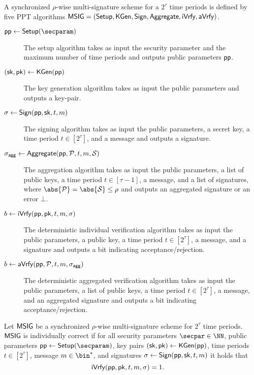 \begin{definition}\label{def:multisig} A synchronized $\rho$-wise multi-signature scheme for a $2^\tau$ time periods is defined by five PPT algorithms $\mathsf{MSIG}=(\mathsf{Setup}, \mathsf{KGen}, \mathsf{Sign},\allowbreak \mathsf{Aggregate},\allowbreak \mathsf{iVrfy}, \mathsf{aVrfy})$.
\begin{description}
  \item[$\params\gets\setup(\secparam)$] The setup algorithm takes as input the security parameter and the maximum number of time periods and outputs public parameters $\mathsf{pp}$.
  \item[$(\mathsf{sk},\mathsf{pk})\gets\mathsf{KGen}(\mathsf{pp})$] The key generation algorithm takes as input the public parameters and outputs a key-pair.
  \item[$\sigma\gets\mathsf{Sign}(\mathsf{pp},\mathsf{sk},t,m)$] The signing algorithm takes as input the public parameters, a secret key, a time period $t\in[2^\tau]$, and a message and outputs a signature.
  \item[$\sigma_\mathsf{agg}\gets\mathsf{Aggregate}(\mathsf{pp},\mathcal{P},t,m,\mathcal{S})$] The aggregation algorithm takes as input the public parameters, a list of public keys, a time period $t\in[\tau-1]$, a message, and a list of signatures, where $\abs{\pubkeys}=\abs{\signatures}\leq\rho$ and outputs an aggregated signature or an error $\bot$.
  \item[$b \gets \mathsf{iVrfy}(\mathsf{pp},\mathsf{pk},t,m,\sigma)$] The deterministic individual verification algorithm takes as input the public parameters, a public key, a time period $t\in[2^\tau]$, a message, and a signature and outputs a bit indicating acceptance/rejection.
  \item[$b \gets \mathsf{aVrfy}(\mathsf{pp},\mathcal{P},t,m,\sigma_\mathsf{agg})$] The deterministic aggregated verification algorithm takes as input the public parameters, a list of public keys, a time period $t\in[2^\tau]$, a message, and an aggregated signature and outputs a bit indicating acceptance/rejection.
\end{description}
\end{definition}

\begin{definition}
  Let $\mathsf{MSIG}$ be a synchronized $\rho$-wise multi-signature scheme for $2^\tau$ time periods.
  $\mathsf{MSIG}$ is individually correct if for all security parameters $\secpar\in\NN$, public parameters $\params\gets\setup(\secparam)$, key pairs $(\mathsf{sk},\mathsf{pk})\gets\mathsf{KGen}(\mathsf{pp})$, time periods $t\in[2^\tau]$, message $m\in\bin^*$, and signatures $\sigma\gets\mathsf{Sign}(\mathsf{pp},\mathsf{sk},t,m)$ it holds that \[\mathsf{iVrfy}(\mathsf{pp},\mathsf{pk},t,m,\sigma) = 1.\]
\end{definition}

